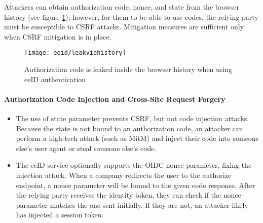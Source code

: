 Attackers can obtain authorization code, nonce, and state from the browser history (see figure \ref{fig:eeid-leakviahistory}); however, for them to be able to use codes, the relying party must be susceptible to CSRF attacks. Mitigation measures are sufficient only when CSRF mitigation is in place.

\begin{figure}
  \centering
  \texttt{[image: eeid/leakviahistory]}
  \caption{Authorization code is leaked inside the browser history when using eeID authentication}
  \label{fig:eeid-leakviahistory}
\end{figure}

\paragraph{Authorization Code Injection and Cross-Site Request Forgery}

\begin{itemize}
  \item The use of state parameter prevents CSRF, but not code injection attacks. Because the state is not bound to an authorization code, an attacker can perform a high-tech attack (such as MitM) and inject their code into someone else's user agent or steal someone else's code.
  \item The eeID service optionally supports the OIDC nonce parameter, fixing the injection attack. When a company redirects the user to the {authorize} endpoint, a nonce parameter will be bound to the given code response. After the relying party receives the identity token, they can check if the nonce parameter matches the one sent initially. If they are not, an attacker likely has injected a session token.
\end{itemize}

